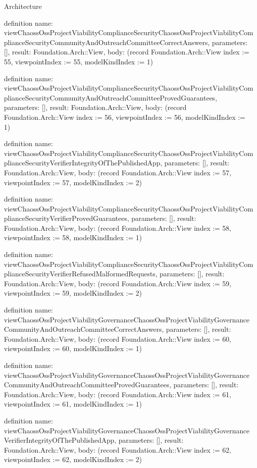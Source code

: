 \begin{lexlean}{Architecture}
\begin{semanticmodule}
definition{
  name: viewChaossOssProjectViabilityComplianceSecurityChaossOssProjectViabilityComplianceSecurityCommunityAndOutreachCommitteeCorrectAnswers,
  parameters: [],
  result: Foundation.Arch::View,
  body: (record Foundation.Arch::View {index := 55, viewpointIndex := 55, modelKindIndex := 1})
}

definition{
  name: viewChaossOssProjectViabilityComplianceSecurityChaossOssProjectViabilityComplianceSecurityCommunityAndOutreachCommitteeProvedGuarantees,
  parameters: [],
  result: Foundation.Arch::View,
  body: (record Foundation.Arch::View {index := 56, viewpointIndex := 56, modelKindIndex := 1})
}

definition{
  name: viewChaossOssProjectViabilityComplianceSecurityChaossOssProjectViabilityComplianceSecurityVerifierIntegrityOfThePublishedApp,
  parameters: [],
  result: Foundation.Arch::View,
  body: (record Foundation.Arch::View {index := 57, viewpointIndex := 57, modelKindIndex := 2})
}

definition{
  name: viewChaossOssProjectViabilityComplianceSecurityChaossOssProjectViabilityComplianceSecurityVerifierProvedGuarantees,
  parameters: [],
  result: Foundation.Arch::View,
  body: (record Foundation.Arch::View {index := 58, viewpointIndex := 58, modelKindIndex := 1})
}

definition{
  name: viewChaossOssProjectViabilityComplianceSecurityChaossOssProjectViabilityComplianceSecurityVerifierRefusedMalformedRequests,
  parameters: [],
  result: Foundation.Arch::View,
  body: (record Foundation.Arch::View {index := 59, viewpointIndex := 59, modelKindIndex := 2})
}

definition{
  name: viewChaossOssProjectViabilityGovernanceChaossOssProjectViabilityGovernanceCommunityAndOutreachCommitteeCorrectAnswers,
  parameters: [],
  result: Foundation.Arch::View,
  body: (record Foundation.Arch::View {index := 60, viewpointIndex := 60, modelKindIndex := 1})
}

definition{
  name: viewChaossOssProjectViabilityGovernanceChaossOssProjectViabilityGovernanceCommunityAndOutreachCommitteeProvedGuarantees,
  parameters: [],
  result: Foundation.Arch::View,
  body: (record Foundation.Arch::View {index := 61, viewpointIndex := 61, modelKindIndex := 1})
}

definition{
  name: viewChaossOssProjectViabilityGovernanceChaossOssProjectViabilityGovernanceVerifierIntegrityOfThePublishedApp,
  parameters: [],
  result: Foundation.Arch::View,
  body: (record Foundation.Arch::View {index := 62, viewpointIndex := 62, modelKindIndex := 2})
}


\end{semanticmodule}
\end{lexlean}
